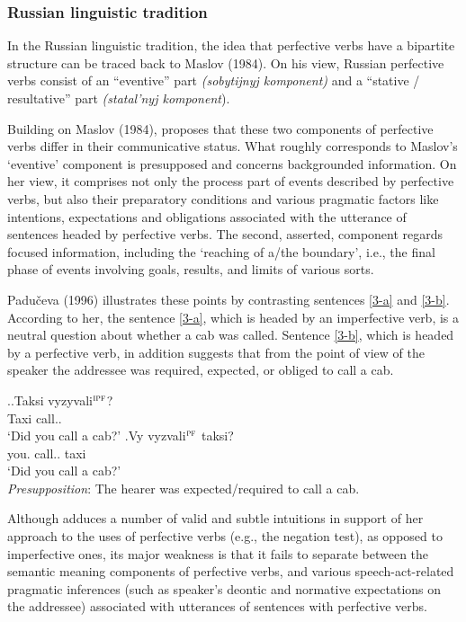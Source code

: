 \subsubsection{Russian linguistic tradition}
In the Russian linguistic tradition, the idea that perfective verbs have a bipartite structure can be traced back to Maslov (1984). On his view, Russian perfective verbs consist of an ``eventive'' part \textit{(sobytijnyj komponent)} and a ``stative / resultative'' part \textit{(statal'nyj komponent}).

Building on Maslov (1984), \citet{Paducheva:96, Paducheva:11} proposes that these two components of perfective verbs differ in their communicative status. What roughly corresponds to Maslov's `eventive' component is presupposed and concerns backgrounded information. On her view, it comprises not only the process part of events described by perfective verbs, but also their preparatory conditions and various pragmatic factors like intentions, expectations and obligations associated with the utterance of sentences headed by perfective verbs. The second, asserted, component regards focused information, including the `reaching of a/the boundary', i.e., the final phase of events involving goals, results, and limits of various sorts. 

Padu\v{c}eva (1996) illustrates these points by contrasting sentences \ref{3-a} and \ref{3-b}. According to her, the sentence \ref{3-a}, which is headed by an imperfective verb, is a neutral question about whether a cab was called. Sentence \ref{3-b}, which is headed by a perfective verb, in addition suggests that from the point of view of the speaker the addressee was required, expected, or obliged to call a cab. 

\ex.\label{3}\ag.\label{3-a}Taksi vyzyvali$^{\textsc{ipf}}$?\\
Taxi call..\\
\trans `Did you call a cab?'
\bg.\label{3-b}Vy vyzvali$^{\textsc{pf}}$ taksi?\\
you. call.. taxi\\
\trans `Did you call a cab?'\\
\textit{Presupposition}: The hearer was expected/required to call a cab.\\

Although \citet{Paducheva:96} adduces a number of valid and subtle intuitions in support of her approach to the uses of perfective verbs (e.g., the negation test), as opposed to imperfective ones, its major weakness is that it fails to separate between the semantic meaning components of perfective verbs,  and various speech-act-related pragmatic inferences (such as speaker's deontic and normative expectations on the addressee) associated with utterances of sentences with perfective verbs. 
 
